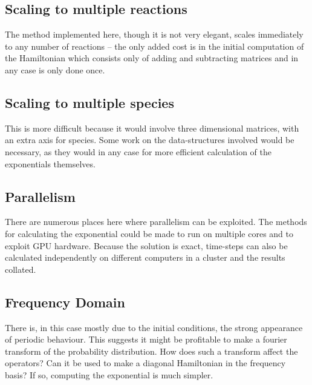 \documentclass{amsart}
\begin{document}
\subsection*{Scaling to multiple reactions}
The method implemented here, though it is not very elegant, scales
immediately to any number of reactions -- the only added cost is in
the initial computation of the Hamiltonian which consists only of
adding and subtracting matrices and in any case is only done once.

\subsection*{Scaling to multiple species}
This is more difficult because it would involve three dimensional
matrices, with an extra axis for species. Some work on the
data-structures involved would be necessary, as they would in any case
for more efficient calculation of the exponentials
themselves.

\subsection*{Parallelism}
There are numerous places here where parallelism can be exploited. The
methods for calculating the exponential could be made to run on
multiple cores and to exploit GPU hardware. Because the solution is
exact, time-steps can also be calculated independently on different
computers in a cluster and the results collated.

\subsection*{Frequency Domain}
There is, in this case mostly due to the initial conditions, the
strong appearance of periodic behaviour. This suggests it might be
profitable to make a fourier transform of the probability
distribution. How does such a transform affect the operators? Can it
be used to make a diagonal Hamiltonian in the frequency basis? If so,
computing the exponential is much simpler.



\end{document}
